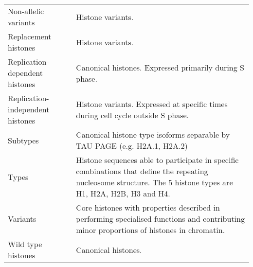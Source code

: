 \begin{table*}[htp]
\begin{tabular}{F p{\dimexpr(\textwidth--4\tabcolsep)}}
      \addlinespace
	  Non-allelic variants &
	  Histone variants. \\
      \addlinespace
      Replacement histones &
	  Histone variants. \\
      \addlinespace
	  Replication-dependent histones &
	  Canonical histones. Expressed primarily during S phase. \\
      \addlinespace
	  Replication-independent histones &
	  Histone variants. Expressed at specific times during cell cycle outside S phase. \\
      \addlinespace
	  Subtypes &
	  Canonical histone type isoforms separable by TAU PAGE 
	  (e.g. H2A.1, H2A.2)
	  \\
      \addlinespace
	  Types &
	  Histone sequences able to participate in specific combinations 
	  that define the repeating nucleosome structure. 
	  The 5 histone types are H1, H2A, H2B, H3 and H4.
	  \\
      \addlinespace
	  Variants &
	  Core histones with properties described in  
	  performing specialised functions and contributing minor proportions of histones in chromatin. \\
      \addlinespace
	  Wild type histones &
	  Canonical histones. \\
      \bottomrule
    \end{tabular}
  \end{table*}
